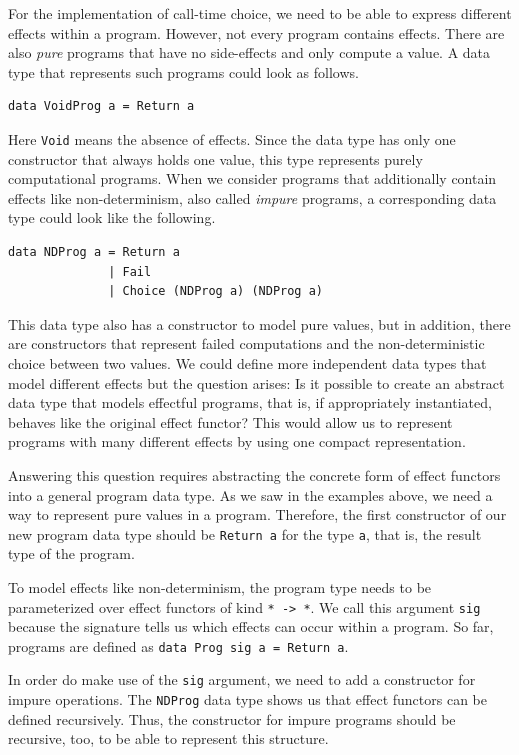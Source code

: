 \documentclass[a4paper, 11pt, fleqn, twoside, abstract=on]{scrreprt}
\newcommand{\hinl}[1]{\texttt{#1}}
\begin{document}
For the implementation of call-time choice, we need to be able to express different effects within a program.
However, not every program contains effects.
There are also \textit{pure} programs that have no side-effects and only compute a value.
A data type that represents such programs could look as follows.

\begin{verbatim}
data VoidProg a = Return a
\end{verbatim}
\noindent
Here \hinl{Void} means the absence of effects. Since the data type has only one constructor that always holds one value, this type represents purely computational programs.
When we consider programs that additionally contain effects like non-determinism, also called \textit{impure} programs, a corresponding data type could look like the following.

\begin{verbatim}
data NDProg a = Return a
              | Fail
              | Choice (NDProg a) (NDProg a)
\end{verbatim}
\noindent
This data type also has a constructor to model pure values, but in addition, there are constructors that represent failed computations and the non-deterministic choice between two values.
We could define more independent data types that model different effects but the question arises: Is it possible to create an abstract data type that models effectful programs, that is, if appropriately instantiated, behaves like the original effect functor?
This would allow us to represent programs with many different effects by using one compact representation.

Answering this question requires abstracting the concrete form of effect functors into a general program data type.
As we saw in the examples above, we need a way to represent pure values in a program.
Therefore, the first constructor of our new program data type should be \hinl{Return a} for the type \hinl{a}, that is, the result type of the program.

To model effects like non-determinism, the program type needs to be parameterized over effect functors of kind \hinl{* -> *}.
We call this argument \hinl{sig} because the signature tells us which effects can occur within a program.
So far, programs are defined as \hinl{data Prog sig a = Return a}.

In order do make use of the \hinl{sig} argument, we need to add a constructor for impure operations.
The \hinl{NDProg} data type shows us that effect functors can be defined recursively.
Thus, the constructor for impure programs should be recursive, too, to be able to represent this structure.
\end{document}
